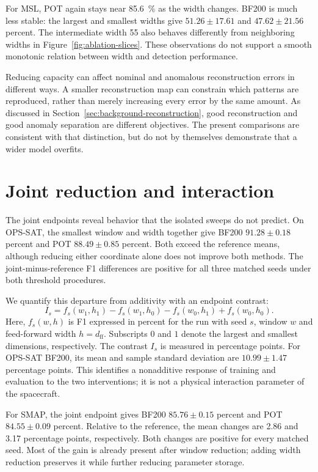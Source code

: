 For \ac{MSL}, \ac{POT} again stays near \SI{85.6}{\percent} as the
width changes. BF200 is much less stable: the largest and smallest widths
give \(\num{51.26}\pm\num{17.61}\) and
\(\num{47.62}\pm\num{21.56}\) percent. The intermediate width
\num{55} also behaves differently from neighboring widths in
Figure~\ref{fig:ablation-slices}. These observations do not support a
smooth monotonic relation between width and detection performance.

Reducing capacity can affect nominal and anomalous reconstruction errors
in different ways. A smaller reconstruction map can constrain which
patterns are reproduced, rather than merely increasing every error by
the same amount. As discussed in
Section~\ref{sec:background-reconstruction}, good reconstruction and good
anomaly separation are different objectives. The present comparisons
are consistent with that distinction, but do not by themselves demonstrate
that a wider model overfits.

\section{Joint reduction and interaction}
\label{sec:ablation-joint}
The joint endpoints reveal behavior that the isolated sweeps do not
predict. On \ac{OPS-SAT}, the smallest window and width together give
BF200 \(\num{91.28}\pm\num{0.18}\) percent and \ac{POT}
\(\num{88.49}\pm\num{0.85}\) percent. Both exceed the reference
means, although reducing either coordinate alone does not improve both
methods. The joint-minus-reference F1 differences are positive for all
three matched seeds under both threshold procedures.

We quantify this departure from additivity with an endpoint contrast:
\begin{equation}
  I_s = f_s(w_1,h_1)-f_s(w_1,h_0)-f_s(w_0,h_1)+f_s(w_0,h_0).
  \label{eq:ablation-interaction}
\end{equation}
Here, \(f_s(w,h)\) is F1 expressed in percent for the run with seed
\(s\), window \(w\) and feed-forward width \(h=d_{\mathrm{ff}}\). Subscripts \(0\)
and \(1\) denote the largest and smallest dimensions, respectively.
The contrast \(I_s\) is measured in percentage points. For \ac{OPS-SAT}
BF200, its mean and sample standard deviation are
\(\num{10.99}\pm\num{1.47}\) percentage points. This identifies a
nonadditive response of training and evaluation to the two interventions;
it is not a physical interaction parameter of the spacecraft.

For \ac{SMAP}, the joint endpoint gives BF200
\(\num{85.76}\pm\num{0.15}\) percent and \ac{POT}
\(\num{84.55}\pm\num{0.09}\) percent. Relative to the reference,
the mean changes are \num{+2.86} and \num{+3.17} percentage points,
respectively. Both changes are positive for every matched seed.
Most of the gain is already present after window reduction; adding width
reduction preserves it while further reducing parameter storage.

